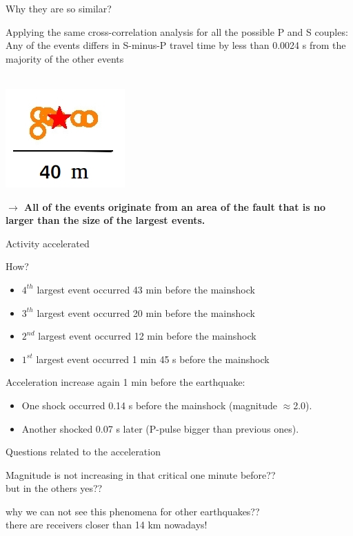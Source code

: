 \documentclass[aspectratio=43,9pt]{beamer}
\begin{document}
\begin{frame}{Why they are so similar?}

\vskip 0.2cm
Applying the same cross-correlation analysis
for all the possible P and S couples: \\
\vskip 0.5cm
Any of the events differs in S-minus-P travel 
time by less than 0.0024 s from the majority of the other events
\vskip 0.5cm

 \\
\vskip 0.2cm
\includegraphics[width=0.3\linewidth]{Figs/fig_dist.jpg}

{\bf $\longrightarrow$ All of the events originate from an area of the fault that is 
no larger than the size of the largest events.}


\end{frame}

\begin{frame}{Activity accelerated}

How?
\begin{itemize}
 \item $4^{th}$ largest event occurred 43 min before the mainshock
 \item $3^{th}$ largest event occurred 20 min before the mainshock
 \item $2^{nd}$ largest event occurred 12 min before the mainshock
 \item $1^{st}$ largest event occurred 1 min 45 s before the mainshock
\end{itemize}
\vskip 0.2cm
Acceleration increase again 1 min before the earthquake:
\begin{itemize}
 \item One shock occurred 0.14 s before the mainshock (magnitude $\approx$2.0).
 \item Another shocked 0.07 s later (P-pulse bigger than previous ones).
\end{itemize}
 
\end{frame}


\begin{frame}{Questions related to the acceleration}
 
 Magnitude is not increasing in that critical one minute before?? \\
 but in the others yes??

 why we can not see this phenomena for other earthquakes?? \\
 there are receivers closer than 14 km nowadays! 

\end{frame}
\end{document}
